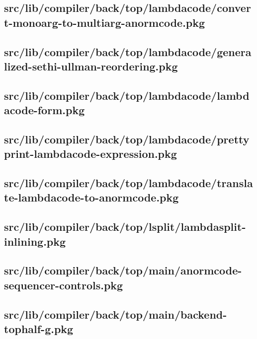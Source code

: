 \subsection{src/lib/compiler/back/top/lambdacode/convert-monoarg-to-multiarg-anormcode.pkg}


\subsection{src/lib/compiler/back/top/lambdacode/generalized-sethi-ullman-reordering.pkg}


\subsection{src/lib/compiler/back/top/lambdacode/lambdacode-form.pkg}


\subsection{src/lib/compiler/back/top/lambdacode/prettyprint-lambdacode-expression.pkg}


\subsection{src/lib/compiler/back/top/lambdacode/translate-lambdacode-to-anormcode.pkg}


\subsection{src/lib/compiler/back/top/lsplit/lambdasplit-inlining.pkg}


\subsection{src/lib/compiler/back/top/main/anormcode-sequencer-controls.pkg}


\subsection{src/lib/compiler/back/top/main/backend-tophalf-g.pkg}


